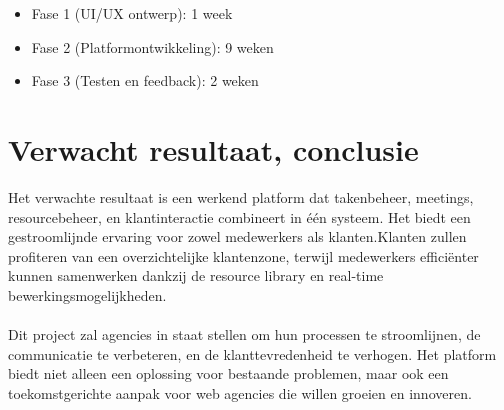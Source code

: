 \begin{itemize}
    \item Fase 1 (UI/UX ontwerp): 1 week
    \item Fase 2 (Platformontwikkeling): 9 weken
    \item Fase 3 (Testen en feedback): 2 weken
    
\end{itemize}

\section{Verwacht resultaat, conclusie}%
\label{sec:verwachte_resultaten}

Het verwachte resultaat is een werkend platform dat takenbeheer, meetings, resourcebeheer, en klantinteractie combineert in één systeem. Het biedt een gestroomlijnde ervaring voor zowel medewerkers als klanten.Klanten zullen profiteren van een overzichtelijke klantenzone, terwijl medewerkers efficiënter kunnen samenwerken dankzij de resource library en real-time bewerkingsmogelijkheden.
\\
\\
Dit project zal agencies in staat stellen om hun processen te stroomlijnen, de communicatie te verbeteren, en de klanttevredenheid te verhogen. Het platform biedt niet alleen een oplossing voor bestaande problemen, maar ook een toekomstgerichte aanpak voor web agencies die willen groeien en innoveren.
